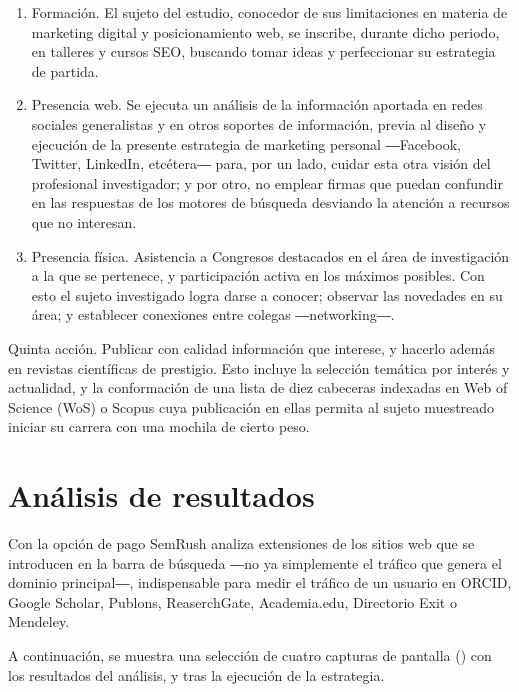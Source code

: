 \documentclass{textolivre}
\begin{document}
\begin{enumerate}[label={\Alph*}]
    \item Formación. El sujeto del estudio, conocedor de sus limitaciones en materia de marketing digital y posicionamiento web, se inscribe, durante dicho periodo, en talleres y cursos SEO, buscando tomar ideas y perfeccionar su estrategia de partida.
    \item  Presencia web. Se ejecuta un análisis de la información aportada en redes sociales generalistas y en otros soportes de información, previa al diseño y ejecución de la presente estrategia de marketing personal ―Facebook, Twitter, LinkedIn, etcétera― para, por un lado, cuidar esta otra visión del profesional investigador; y por otro, no emplear firmas que puedan confundir en las respuestas de los motores de búsqueda desviando la atención a recursos que no interesan.
    \item Presencia física. Asistencia a Congresos destacados en el área de investigación a la que se pertenece, y participación activa en los máximos posibles. Con esto el sujeto investigado logra darse a conocer; observar las novedades en su área; y establecer conexiones entre colegas ―networking―.
\end{enumerate}
    
Quinta acción. Publicar con calidad información que interese, y hacerlo además en revistas científicas de prestigio. Esto incluye la selección temática por interés y actualidad, y la conformación de una lista de diez cabeceras indexadas en Web of Science (WoS) o Scopus cuya publicación en ellas permita al sujeto muestreado iniciar su carrera con una mochila de cierto peso.

\section{Análisis de resultados}\label{sec-resultados}
Con la opción de pago SemRush analiza extensiones de los sitios web que se introducen en la barra de búsqueda ―no ya simplemente el tráfico que genera el dominio principal―, indispensable para medir el tráfico de un usuario en ORCID, Google Scholar, Publons, ReaserchGate, Academia.edu, Directorio Exit o Mendeley.

A continuación, se muestra una selección de cuatro capturas de pantalla () con los resultados del análisis, y tras la ejecución de la estrategia.
\end{document}
